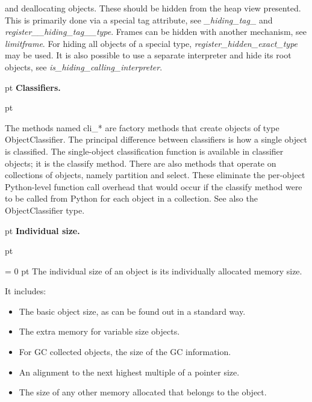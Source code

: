 {{{and deallocating objects. These should be hidden from the heap view
presented. This is primarily done via a special tag attribute, see  {\em {\_}hiding{\_}tag{\_}\/} and  {\em register{\_}{\_}hiding{\_}tag{\_}{\_}type\/}. Frames can be hidden
with another mechanism, see  {\em limitframe\/}. For hiding all objects of a special type,  {\em register{\_}hidden{\_}exact{\_}type\/} may be used. It is also
possible to use a separate interpreter and hide its root objects, see  {\em is{\_}hiding{\_}calling{\_}interpreter\/}.
 \par}
{\par \pagebreak[2]  pt \noindent
{\large {\bf  Classifiers.\/}}\par {} pt
} \noindent
The methods named cli{\_}* are factory methods that create objects of
type ObjectClassifier. The principal difference between classifiers is
how a single object is classified. The single-object classification
function is available in classifier objects; it is the classify
method. There are also methods that operate on collections of objects,
namely partition and select. These eliminate the per-object
Python-level function call overhead that would occur if the classify
method were to be called from Python for each object in a collection.
See also the ObjectClassifier type.
{\par \pagebreak[2]  pt \noindent
{\large {\bf  Individual size.\/}}\par {} pt
} \noindent
{\par \parindent = 0 pt 
The individual size of an object is its individually allocated memory size.
 \par}
{\par 
It includes:
 \par}
\begin{itemize}
\item  The basic object size, as can be found out in a standard way.\item  The extra memory for variable size objects.\item  For GC collected objects, the size of the GC information.\item  An alignment to the next highest multiple of a pointer size.\item  The size of any other memory allocated that belongs to the object.\end{itemize}
{\par 

}}}
